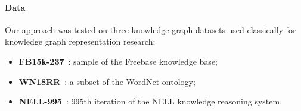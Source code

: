 
\paragraph{Data}

Our approach was tested on three knowledge graph datasets used classically for knowledge graph representation research:
\begin{itemize}
    \item \textbf{FB15k-237}~\cite{toutanova_observed_2015}: sample of the Freebase knowledge base;
    \item \textbf{WN18RR}~\cite{dettmers_convolutional_2018}: a subset of the WordNet ontology;
    \item \textbf{NELL-995}~\cite{xiong_deeppath_2017}: 995th iteration of the NELL knowledge reasoning system.
\end{itemize}

